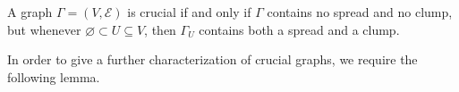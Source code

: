 A graph $\Gamma = (V, \mathcal{E})$ is crucial if and only if $\Gamma$ contains no spread and no clump, but whenever $\varnothing \subset U \subseteq V$, then $\Gamma_U$ contains both a spread and a clump.

In order to give a further characterization of crucial graphs, we require the following lemma.
